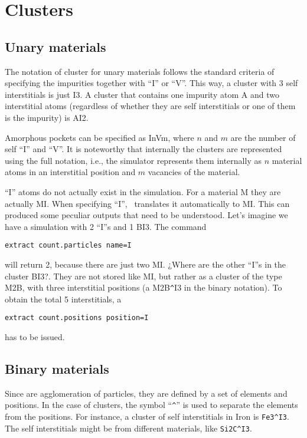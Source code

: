 \section{Clusters}
\label{sec:syntaxis}

\subsection{Unary materials}

The notation of cluster for unary materials follows the standard criteria of specifying the impurities together with ``I'' or ``V''. This way, a cluster with 3 self interstitials is just I3. A cluster that contains one impurity atom A and two interstitial atoms (regardless of whether they are self interstitials or one of them is the impurity) is AI2. 

Amorphous pockets can be specified as InVm, where $n$ and $m$ are the number of self ``I'' and ``V''. It is noteworthy that internally the clusters are represented using the full notation, i.e., the simulator represents them internally as $n$ material atoms in an interstitial position and $m$ vacancies of the material.

``I'' atoms do not actually exist in the simulation. For a material M they are actually MI. When specifying ``I'',
\MMonCa\ translates it automatically to MI. This can produced some peculiar outputs that need to be understood. Let's imagine we have a simulation with 2 ``I''s and 1 BI3. The command
\begin{lstlisting}
extract count.particles name=I
\end{lstlisting}
will return 2, because there are just two MI. ¿Where are the other ``I''s in the cluster BI3?. They are not stored like MI, but rather as a cluster of the type M2B, with three interstitial positions (a M2B\verb+^+I3  in the binary notation). To obtain the total 5 interstitials, a 
\begin{lstlisting}
extract count.positions position=I
\end{lstlisting}
has to be issued. 


\subsection{Binary materials}

Since  are agglomeration of particles, they are defined by a set of elements and positions. In the case of clusters, the symbol ``\verb+^+'' is used to separate the elements from the positions. For instance, a cluster of self interstitials in Iron is \verb+Fe3^I3+. The self interstitials might be from different materials, like \verb+Si2C^I3+.

